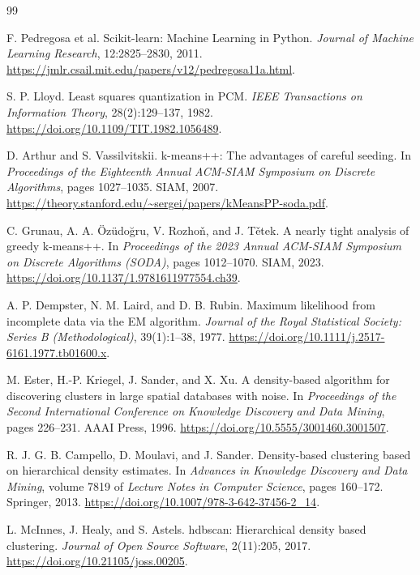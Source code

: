 \documentclass[11pt,a4paper]{article}
\begin{document}
\begin{thebibliography}{99}

F. Pedregosa et al.
\newblock Scikit-learn: Machine Learning in Python.
\newblock \emph{Journal of Machine Learning Research}, 12:2825--2830, 2011.
\newblock \url{https://jmlr.csail.mit.edu/papers/v12/pedregosa11a.html}.

S. P. Lloyd.
\newblock Least squares quantization in PCM.
\newblock \emph{IEEE Transactions on Information Theory}, 28(2):129--137, 1982.
\newblock \url{https://doi.org/10.1109/TIT.1982.1056489}.

D. Arthur and S. Vassilvitskii.
\newblock k-means++: The advantages of careful seeding.
\newblock In \emph{Proceedings of the Eighteenth Annual ACM-SIAM Symposium on Discrete Algorithms}, pages 1027--1035. SIAM, 2007.
\newblock \url{https://theory.stanford.edu/~sergei/papers/kMeansPP-soda.pdf}.

C. Grunau, A. A. Özüdoğru, V. Rozhoň, and J. Tětek.
\newblock A nearly tight analysis of greedy k-means++.
\newblock In \emph{Proceedings of the 2023 Annual ACM-SIAM Symposium on Discrete Algorithms (SODA)}, pages 1012--1070. SIAM, 2023.
\newblock \url{https://doi.org/10.1137/1.9781611977554.ch39}.

A. P. Dempster, N. M. Laird, and D. B. Rubin.
\newblock Maximum likelihood from incomplete data via the EM algorithm.
\newblock \emph{Journal of the Royal Statistical Society: Series B (Methodological)}, 39(1):1--38, 1977.
\newblock \url{https://doi.org/10.1111/j.2517-6161.1977.tb01600.x}.

M. Ester, H.-P. Kriegel, J. Sander, and X. Xu.
\newblock A density-based algorithm for discovering clusters in large spatial databases with noise.
\newblock In \emph{Proceedings of the Second International Conference on Knowledge Discovery and Data Mining}, pages 226--231. AAAI Press, 1996.
\newblock \url{https://doi.org/10.5555/3001460.3001507}.

R. J. G. B. Campello, D. Moulavi, and J. Sander.
\newblock Density-based clustering based on hierarchical density estimates.
\newblock In \emph{Advances in Knowledge Discovery and Data Mining}, volume 7819 of \emph{Lecture Notes in Computer Science}, pages 160--172. Springer, 2013.
\newblock \url{https://doi.org/10.1007/978-3-642-37456-2_14}.

L. McInnes, J. Healy, and S. Astels.
\newblock hdbscan: Hierarchical density based clustering.
\newblock \emph{Journal of Open Source Software}, 2(11):205, 2017.
\newblock \url{https://doi.org/10.21105/joss.00205}.


\end{thebibliography}
\end{document}
